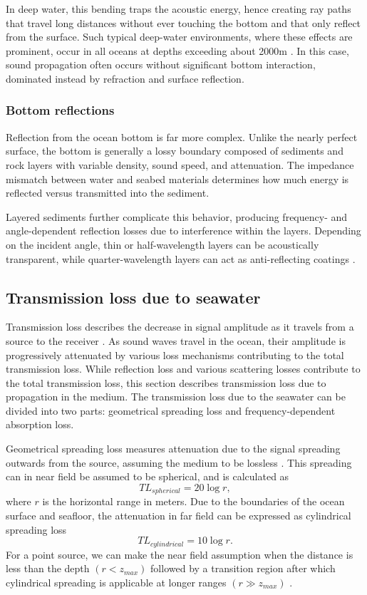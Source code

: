 \documentclass[fleqn]{jaes}
\begin{document}
In deep water, this bending traps the acoustic energy, hence creating ray paths that travel long distances without ever touching the bottom and that only reflect from the surface. Such typical deep-water environments, where these effects are prominent, occur in all oceans at depths exceeding about 2000m \cite{Jensen}. In this case, sound propagation often occurs without significant bottom interaction, dominated instead by refraction and surface reflection.

\subsubsection{Bottom reflections}
Reflection from the ocean bottom is far more complex. Unlike the nearly perfect surface, the bottom is generally a lossy boundary composed of sediments and rock layers with variable density, sound speed, and attenuation. The impedance mismatch between water and seabed materials determines how much energy is reflected versus transmitted into the sediment.

Layered sediments further complicate this behavior, producing frequency- and angle-dependent reflection losses due to interference within the layers. Depending on the incident angle, thin or half-wavelength layers can be acoustically transparent, while quarter-wavelength layers can act as anti-reflecting coatings \cite{Jensen}.

\subsection{Transmission loss due to seawater}
\label{sub:transmissionloss}
Transmission loss describes the decrease in signal amplitude as it travels from a source to the receiver \cite{Jensen}. As sound waves travel in the ocean, their amplitude is progressively attenuated by various loss mechanisms contributing to the total transmission loss. While reflection loss and various scattering losses contribute to the total transmission loss, this section describes transmission loss due to propagation in the medium. The transmission loss due to the seawater can be divided into two parts: geometrical spreading loss and frequency-dependent absorption loss.

Geometrical spreading loss measures attenuation due to the signal spreading outwards from the source, assuming the medium to be lossless \cite{Jensen}. This spreading can in near field be assumed to be spherical, and is calculated as
\begin{equation}
    TL_{spherical}=20\log r,
\end{equation}
where $r$ is the horizontal range in meters. Due to the boundaries of the ocean surface and seafloor, the attenuation in far field can be expressed as  cylindrical spreading loss
\begin{equation}
    TL_{cylindrical}=10\log r.
\end{equation}
For a point source, we can make the near field assumption when the distance is less than the depth $(r<z_{max})$ followed by a transition region after which cylindrical spreading is applicable at longer ranges $(r\gg z_{max})$ \cite{Jensen}.
\end{document}
